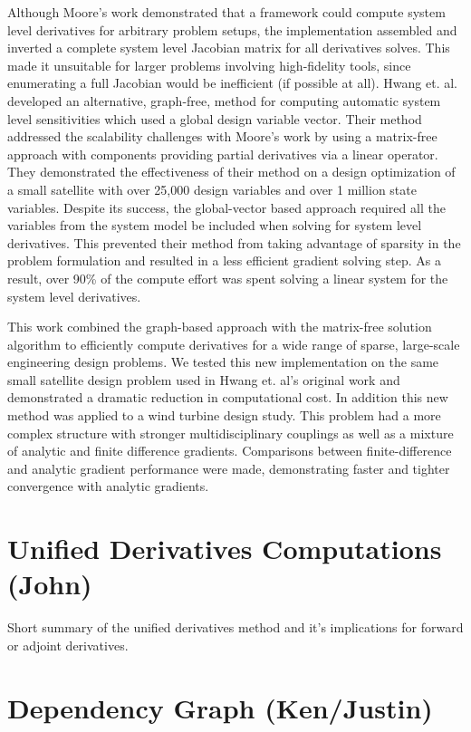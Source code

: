 \documentclass[]{aiaa-tc} %
\begin{document}
    Although Moore's work demonstrated that a framework could compute system level derivatives for arbitrary
    problem setups, the implementation assembled and inverted a complete system level Jacobian matrix for 
    all derivatives solves.  This made it unsuitable for larger problems involving 
    high-fidelity tools, since enumerating a full Jacobian would be inefficient (if possible at all).
    Hwang et. al. developed an alternative, graph-free, method for computing automatic system
    level sensitivities which used a global design variable vector\cite{CADRE2012}. Their method 
    addressed the scalability challenges with Moore's work by using a matrix-free approach with 
    components providing partial derivatives via a linear operator. They demonstrated the 
    effectiveness of their method on a design optimization of a small satellite
    with over 25,000 design variables and over 1 million state variables. Despite its success,
    the global-vector based approach required all the variables from the system model be
    included when solving for system level derivatives. This prevented their method
    from taking advantage of sparsity in the problem formulation and resulted in a less efficient gradient solving step.
    As a result, over 90\% of the compute effort was spent solving a linear system for the system
    level derivatives.

    This work combined the graph-based approach with the matrix-free solution algorithm
    to efficiently compute derivatives for a wide range of sparse, large-scale engineering
    design problems. We tested this new implementation on the same small satellite design problem used in 
    Hwang et. al's original work and demonstrated a dramatic reduction in computational cost. In addition
    this new method was applied to a wind turbine design study. This problem had a more 
    complex structure with stronger multidisciplinary couplings as well as a mixture of 
    analytic and finite difference gradients. Comparisons between finite-difference and analytic gradient 
    performance were made, demonstrating faster and tighter convergence with analytic gradients. 

  \section{Unified Derivatives Computations (John)}
    Short summary of the unified derivatives method and it's implications for forward or adjoint derivatives.


  \section{Dependency Graph (Ken/Justin)}\label{section:depgraph}
\end{document}
